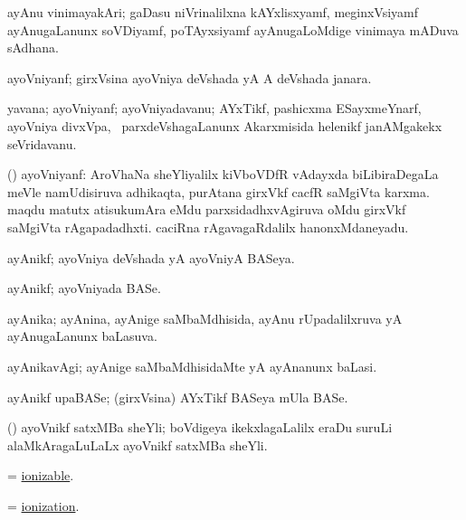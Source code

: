 \bentry
{}
\gl{\nA}
\bmng
ayAnu vinimayakAri; gaDasu niVrinalilxna kAYxlisxyamf, meginxVsiyamf ayAnugaLanunx soVDiyamf, poTAyxsiyamf ayAnugaLoMdige vinimaya mADuva sAdhana. 
\emng
\eentry

\bentry
{}
\gl{\gu}
\bmng
ayoVniyanf; girxVsina ayoVniya deVshada yA A deVshada janara. 
\emng
\eentry

\bentry
{}
\gl{\nA}
\bmng
yavana; ayoVniyanf; ayoVniyadavanu; AYxTikf, pashicxma ESayxmeYnarf, ayoVniya divxVpa, \mo\ parxdeVshagaLanunx Akarxmisida helenikf janAMgakekx seVridavanu. 
\emng
\eentry

\bentry
{}
\gl{\nA}
\bmng
(\saM) ayoVniyanf: 
\banum
{} AroVhaNa sheYliyalilx kiVboVDfR vAdayxda biLibiraDegaLa meVle namUdisiruva adhikaqta, purAtana girxVkf cacfR saMgiVta karxma. 
 maqdu matutx atisukumAra eMdu parxsidadhxvAgiruva oMdu girxVkf saMgiVta rAgapadadhxti. 
 caciRna rAgavagaRdalilx hanonxMdaneyadu. 
\eanum
\emng
\eentry

\bentry
{}
\gl{\gu}
\bmng
ayAnikf; ayoVniya deVshada yA ayoVniyA BASeya. 
\emng
\eentry

\bentry
{}
\gl{\nA}
\bmng
ayAnikf; ayoVniyada BASe. 
\emng
\eentry

\bentry
{}
\gl{\gu}
\bmng
ayAnika; ayAnina, ayAnige saMbaMdhisida, ayAnu rUpadalilxruva yA ayAnugaLanunx baLasuva. 
\emng
\eentry

\bentry
{}
\gl{\kirxvi}
\bmng
ayAnikavAgi; ayAnige saMbaMdhisidaMte yA ayAnanunx baLasi. 
\emng
\eentry

\bentry
{}
\gl{\nA}
\bmng
ayAnikf upaBASe; (girxVsina) AYxTikf BASeya mUla BASe. 
\emng
\eentry

\bentry
{}
\gl{\nA}
\bmng
(\vAshi) ayoVnikf satxMBa sheYli; boVdigeya ikekxlagaLalilx eraDu suruLi alaMkAragaLuLaLx ayoVnikf satxMBa sheYli.  
\emng
\eentry

\bentry
{}
\gl{\gu}
\bmng
=  \hyperlink{ionizable}{ionizable}. 
\emng
\eentry

\bentry
{}
\gl{\nA}
\bmng
=  \hyperlink{ionization}{ionization}. 
\emng
\eentry

